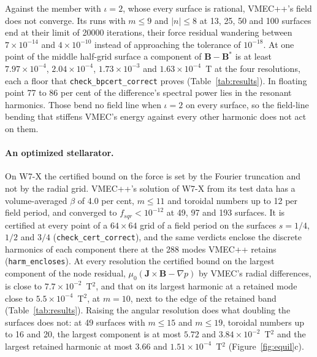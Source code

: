\documentclass[11pt]{article}
\newcommand{\code}[1]{\texttt{#1}}
\begin{document}
Against the member with $\iota=2$, whose every surface is rational, VMEC++'s
field does not converge. Its runs with $m\le9$ and $|n|\le8$ at 13, 25, 50 and
100 surfaces end at their limit of 20000 iterations, their force residual
wandering between $7\times10^{-14}$ and $4\times10^{-10}$ instead of approaching
the tolerance of $10^{-18}$. At one point of the middle half-grid surface a
component of $\mathbf{B}-\mathbf{B}^*$ is at least $7.97\times10^{-4}$,
$2.04\times10^{-4}$, $1.73\times10^{-3}$ and $1.63\times10^{-4}$~T at the four
resolutions, each a floor that \code{check\_bpcert\_correct} proves
(Table~\ref{tab:results}). In floating point 77 to 86 per cent of the
difference's spectral power lies in the resonant harmonics. Those bend no field
line when $\iota=2$ on every surface, so the field-line bending that stiffens
VMEC's energy against every other harmonic does not act on them.

\paragraph{An optimized stellarator.}
On W7-X the certified bound on the force is set by the Fourier truncation and
not by the radial grid. VMEC++'s solution of W7-X from its test data has a volume-averaged
$\beta$ of 4.0 per cent, $m\le11$ and toroidal numbers up to 12 per field
period, and converged to $f_{sqr}<10^{-12}$ at 49, 97 and 193 surfaces. It is
certified at every point of a $64\times64$ grid of a field period on the
surfaces $s=1/4$, $1/2$ and $3/4$ (\code{check\_cert\_correct}), and the same
verdicts enclose the discrete harmonics of each component there at the 288
modes VMEC++ retains (\code{harm\_encloses}). At every resolution the certified
bound on the largest component of the node residual, $\mu_0(\mathbf{J}\times
\mathbf{B}-\nabla p)$ by VMEC's radial differences, is close to
$7.7\times10^{-2}$~T$^2$, and that on its largest harmonic at a retained mode
close to $5.5\times10^{-4}$~T$^2$, at $m=10$, next to the edge of the retained
band (Table~\ref{tab:results}). Raising the angular resolution does what doubling
the surfaces does not: at 49 surfaces with $m\le15$ and $m\le19$, toroidal
numbers up to 16 and 20, the largest component is at most $5.72$ and
$3.84\times10^{-2}$~T$^2$ and the largest retained harmonic at most $3.66$ and
$1.51\times10^{-4}$~T$^2$ (Figure~\ref{fig:equil}c).
\end{document}
